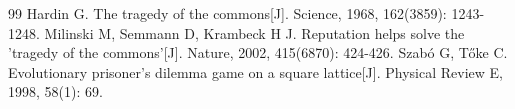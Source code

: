 \documentclass[UTF8,a4paper,12pt]{ctexart}
\begin{document}
\begin{thebibliography}{99}
     Hardin G. The tragedy of the commons[J]. Science, 1968, 162(3859): 1243-1248.
     Milinski M, Semmann D, Krambeck H J. Reputation helps solve the 'tragedy of the commons'[J]. Nature, 2002, 415(6870): 424-426.
     Szabó G, Tőke C. Evolutionary prisoner's dilemma game on a square lattice[J]. Physical Review E, 1998, 58(1): 69.

\end{thebibliography}
\end{document}
